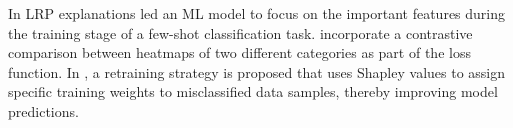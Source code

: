 
%

%
%
In \cite{sun2021explanation} LRP explanations \citep{montavon2019layer} led an ML model to focus on the important features during the training stage of a few-shot classification task. %
% 
\cite{liu2023icel} incorporate a contrastive comparison between heatmaps of two different categories as part of the loss function. %
%
In \cite{sun2022utilizing}, a retraining strategy is proposed that uses Shapley values \citep{NIPS2017_7062} to assign specific training weights to misclassified data samples, thereby improving model predictions. %

